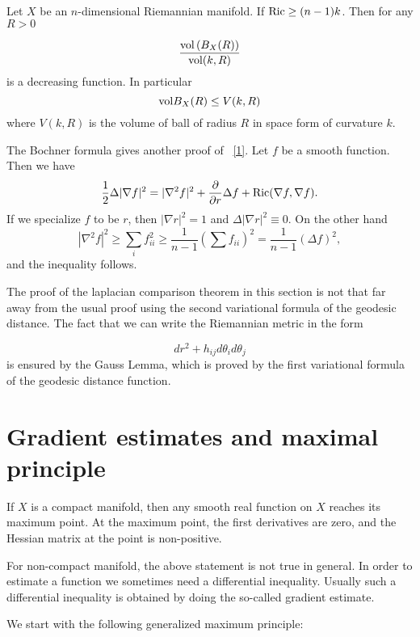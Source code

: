 \begin{corollary}[Bishop] Let $ X$ be an $n$-dimensional Riemannian manifold. If $ {\rm Ric} \geq (n-1) k$. Then for any 
$R > 0 $ 
\end{corollary}
%
\[\frac{{\rm vol}\, (B_X (R))}{{\rm vol} (k, R)} \]
%
is a decreasing function. In particular 
%
\[ {\rm vol} B_X (R) \leq V (k, R) \]
%
where $ V(k, R) $ is the volume of ball of radius $R$ in space form of curvature $k$.


\begin{remark} The Bochner formula gives another proof of ~\eqref{1}. Let $f$ be a smooth function. Then we have
%
\[\frac{1}{2} \Delta |\nabla f| ^2 = |\nabla ^2 f |^2 + \frac{\partial }{\partial r} \Delta f + {\rm Ric} ( \nabla  f, \nabla f ).\]
%
If we specialize $f$ to be $r$, then $ |\nabla r |^2 = 1 $ and $ \Delta |\nabla r| ^2 \equiv 0$.  On the other hand
%
\[| \nabla ^2 f |^2 \geq \sum_i f_{ii}^2 \geq \frac{1}{n-1} \left( \sum f_{ii} \right) ^2 = \frac{1}{n-1} ( \Delta f ) ^2,  \]
%
and the inequality follows. 
\end{remark}

\begin{remark} The proof of the laplacian comparison theorem in this section is not that far away from the usual proof using the second variational formula of the geodesic distance. The fact that we can write the Riemannian metric in the form

\[dr^2 + h_{ij} d \theta_i d \theta_j \]
is ensured  by the Gauss Lemma,  which is proved by the first variational formula of the geodesic distance function.
\end{remark}



\section{Gradient estimates and maximal principle}

If $X$ is a compact manifold, then any smooth real function on $X$ reaches its maximum point. At the maximum point, the first derivatives are zero, and the Hessian matrix at the point is non-positive.

For non-compact manifold, the above statement is not true in general. In order to estimate a function we sometimes need a differential inequality. Usually such a differential inequality is obtained by doing the so-called gradient estimate.

We start with the following generalized maximum principle:

